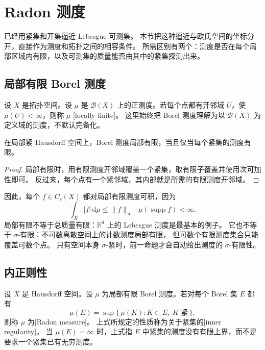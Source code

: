 \section{Radon 测度}
\label{b1:sec:1102}

已经用紧集和开集逼近 Lebesgue 可测集。
本节把这种逼近与欧氏空间的坐标分开，直接作为测度和拓扑之间的相容条件。
所需区别有两个：测度是否在每个局部区域内有限，以及可测集的质量能否由其中的紧集探测出来。

\subsection{局部有限 Borel 测度}
\label{b1:subsec:110201}

\begin{definition}\label{b1:def:locally-finite-borel}
设 \(X\) 是拓扑空间。设 \(\mu\) 是 \(\mathcal B(X)\) 上的正测度。若每个点都有开邻域 \(U\)，使
\(\mu(U)<\infty\)，则称 \(\mu\) [locally finite]。
这里始终把 Borel 测度理解为以 \(\mathcal B(X)\) 为定义域的测度，不默认完备化。
\end{definition}

\begin{proposition}\label{b1:prop:lch-compact-finite}
在局部紧 Hausdorff 空间上，Borel 测度局部有限，当且仅当每个紧集的测度有限。
\end{proposition}
\begin{proof}
局部有限时，用有限测度开邻域覆盖一个紧集，取有限子覆盖并使用次可加性即可。
反过来，每个点有一个紧邻域，其内部就是所需的有限测度开邻域。
\end{proof}

因此，每个 \(f\in C_c(X)\) 都对局部有限测度可积，因为
\[
 \int_X|f|\,\mathrm d\mu
 \leq\|f\|_\infty\cdot \mu(\operatorname{supp}f)<\infty.
\]
局部有限不等于总质量有限：\(\mathbb R^d\) 上的 Lebesgue 测度是最基本的例子。
它也不等于 \(\sigma\)-有限：不可数离散空间上的计数测度局部有限，
但可数个有限测度集合只能覆盖可数个点。
只有空间本身 \(\sigma\)-紧时，前一命题才会自动给出测度的 \(\sigma\)-有限性。

\subsection{内正则性}
\label{b1:subsec:110202}

\begin{definition}\label{b1:def:radon-measure}
设 \(X\) 是 Hausdorff 空间。设 \(\mu\) 为局部有限 Borel 测度。若对每个 Borel 集 \(E\) 都有
\[
 \mu(E)=\sup\{\,\mu(K):K\subset E,\ K\text{ 紧}\,\},
\]
则称 \(\mu\) 为[Radon measure]。
上式所规定的性质称为关于紧集的[inner regularity]。
当 \(\mu(E)=\infty\) 时，上式指 \(E\) 中紧集的测度没有有限上界，而不是要求一个紧集已有无穷测度。
\end{definition}

